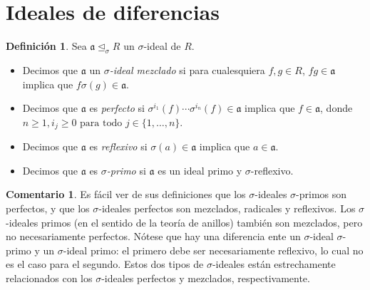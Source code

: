 \documentclass[letterpaper]{article}
\def\fa{\text{ para todo }}
\def\a{\mathfrak{a}}
\def\s{\sigma}
\def\si{\unlhd_{\sigma}}
\theoremstyle{definition}
\newtheorem{rem}[Satz]{Comentario}
\newtheorem{defn}[Satz]{Definici\'on}
\begin{document}
\section{Ideales de diferencias}\label{ideales}

\begin{defn}
Sea  $\a \si R$ un $\sigma$-ideal de $R$. 
\begin{itemize}
\item Decimos que  $\a$ un $\sigma$\emph{-ideal mezclado} si para cualesquiera $f,g \in R$, $fg \in \a$ implica que $f \sigma(g) \in \a$.
\item Decimos que $\a$ es \emph{perfecto} si $\sigma^{i_1}(f) \cdots \sigma^{i_n}(f) \in \a$ implica que $f \in \a$, donde $n \geq 1, i_j \geq 0 \fa j \in \{1,\ldots,n\}$.
\item Decimos que $\a$ es \emph{reflexivo} si $\s(a) \in \a$ implica que $a \in \a$.
\item Decimos que $\a$ es $\s$\emph{-primo} si $\a$ es un ideal primo y $\sigma$-reflexivo.
\end{itemize}
\end{defn}

\begin{rem}
Es f\'acil ver de sus definiciones que los $\sigma$-ideales $\sigma$-primos son perfectos, y que los $\sigma$-ideales perfectos son mezclados, radicales y reflexivos. Los $\sigma$-ideales primos (en el sentido de la teor\'ia de anillos) tambi\'en son mezclados, pero no necesariamente perfectos. N\'otese que hay una diferencia ente un $\sigma$-ideal $\sigma$-primo y un $\s$-ideal primo: el primero debe ser necesariamente reflexivo, lo cual no es el caso para el segundo. 
Estos dos tipos de $\sigma$-ideales est\'an estrechamente relacionados con los $\sigma$-ideales perfectos y mezclados, respectivamente.
\end{rem}
\end{document}
